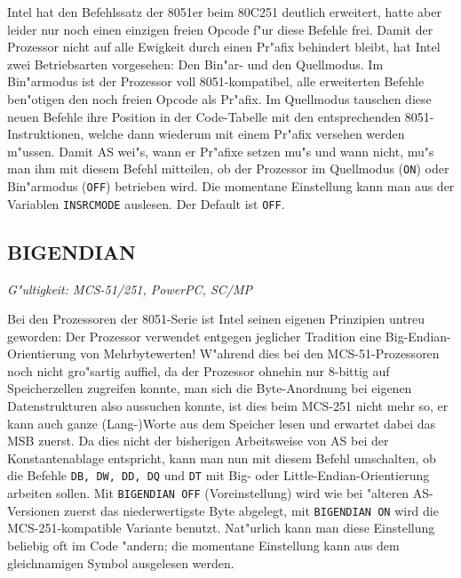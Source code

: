 \documentclass[12pt,a4paper,twoside]{report}
\makeatletter
\newcommand{\tty}[1]{{\tt #1}}
\newcommand{\ttindex}[1]{\index{#1@{\tt #1}}}
\makeatother
\begin{document}
Intel hat den Befehlssatz der 8051er beim 80C251 deutlich erweitert,
hatte aber leider nur noch einen einzigen freien Opcode f"ur diese
Befehle frei.  Damit der Prozessor nicht auf alle Ewigkeit durch
einen Pr"afix behindert bleibt, hat Intel zwei Betriebsarten vorgesehen:
Den Bin"ar- und den Quellmodus.  Im Bin"armodus ist der Prozessor voll
8051-kompatibel, alle erweiterten Befehle ben"otigen den noch freien
Opcode als Pr"afix.  Im Quellmodus tauschen diese neuen Befehle ihre
Position in der Code-Tabelle mit den entsprechenden 8051-Instruktionen,
welche dann wiederum mit einem Pr"afix versehen werden m"ussen.
Damit AS wei"s, wann er Pr"afixe setzen mu"s und wann nicht, mu"s man
ihm mit diesem Befehl mitteilen, ob der Prozessor im Quellmodus (\tty{ON})
oder Bin"armodus (\tty{OFF}) betrieben wird.  Die momentane Einstellung
kann man aus der Variablen \tty{INSRCMODE} auslesen.  Der Default ist
\tty{OFF}.


\subsection{BIGENDIAN}
\ttindex{BIGENDIAN}

{\em G"ultigkeit: MCS-51/251, PowerPC, SC/MP}

Bei den Prozessoren der 8051-Serie ist Intel seinen eigenen Prinzipien
untreu geworden: Der Prozessor verwendet entgegen jeglicher Tradition
eine Big-Endian-Orientierung von Mehrbytewerten!  W"ahrend dies bei
den MCS-51-Prozessoren noch nicht gro"sartig auffiel, da der Prozessor
ohnehin nur 8-bittig auf Speicherzellen zugreifen konnte, man sich die
Byte-Anordnung bei eigenen Datenstrukturen also aussuchen konnte, ist
dies beim MCS-251 nicht mehr so, er kann auch ganze (Lang-)Worte aus
dem Speicher lesen und erwartet dabei das MSB zuerst.  Da dies nicht der
bisherigen Arbeitsweise von AS bei der Konstantenablage entspricht,
kann man nun mit diesem Befehl umschalten, ob die Befehle \tty{DB, DW, DD,
DQ} und \tty{DT} mit Big- oder Little-Endian-Orientierung arbeiten sollen.
Mit \tty{BIGENDIAN OFF} (Voreinstellung) wird wie bei "alteren AS-Versionen
zuerst das niederwertigste Byte abgelegt, mit \tty{BIGENDIAN ON} wird die
MCS-251-kompatible Variante benutzt.  Nat"urlich kann man diese Einstellung
beliebig oft im Code "andern; die momentane Einstellung kann aus dem
gleichnamigen Symbol ausgelesen werden.

\end{document}
